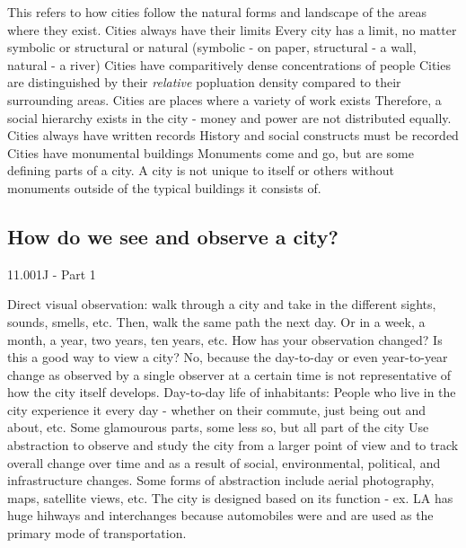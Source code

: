 \documentclass{article}
\begin{document}
\begin{outline}
                \2 This refers to how cities follow the natural forms and landscape of the areas where they exist. 
            \1 Cities always have their limits 
                \2 Every city has a limit, no matter symbolic or structural or natural (symbolic - on paper, structural - a wall, natural - a river)
            \1 Cities have comparitively dense concentrations of people 
                \2 Cities are distinguished by their \textit{relative} popluation density compared to their surrounding areas. 
            \1 Cities are places where a variety of work exists 
                \2 Therefore, a social hierarchy exists in the city - money and power are not distributed equally. 
            \1 Cities always have written records
                \2 History and social constructs must be recorded
            \1 Cities have monumental buildings
                \2 Monuments come and go, but are some defining parts of a city. A city is not unique to itself or others without monuments outside of the typical buildings it consists of. 
        \end{outline}
        \subsection{How do we see and observe a city?}
        \small 11.001J - Part 1
        \normalsize 
        \begin{outline}
            \1 Direct visual observation: walk through a city and take in the different sights, sounds, smells, etc. Then, walk the same path the next day. Or in a week, a month, a year, two years, ten years, etc. How has your observation changed?
                \2 Is this a good way to view a city? No, because the day-to-day or even year-to-year change as observed by a single observer at a certain time is not representative of how the city itself develops. 
            \1 Day-to-day life of inhabitants: People who live in the city experience it every day - whether on their commute, just being out and about, etc. 
            \1 Some glamourous parts, some less so, but all part of the city
            \1 Use abstraction to observe and study the city from a larger point of view and to track overall change over time and as a result of social, environmental, political, and infrastructure changes. 
                \2 Some forms of abstraction include aerial photography, maps, satellite views, etc. 
            \1 The city is designed based on its function - ex. LA has huge hihways and interchanges because automobiles were and are used as the primary mode of transportation. 
        \end{outline}
\end{document}

